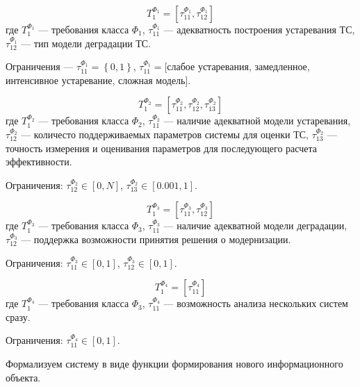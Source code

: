 \begin{equation}
    \label{eq:formal_requirements_1}
    T^{\Phi_1}_1=[\tau^{\Phi_1}_{11},\tau^{\Phi_1}_{12}]
\end{equation}
\vspace{\baselineskip}
где $T^{\Phi_1}_1$ --- требования класса $\Phi_1$,
$\tau^{\Phi_1}_{11}$ --- адекватность построения устаревания ТС,
$\tau^{\Phi_1}_{12}$ --- тип модели деградации ТС.

Ограничения --- $\tau^{\Phi_1}_{11} = \left\{ 0,1 \right\}$,
$\tau^{\Phi_1}_{11} = $[слабое устаревания, замедленное, интенсивное устаревание, сложная модель].


\begin{equation}
    \label{eq:formal_requirements_2}
    T^{\Phi_2}_1=[\tau^{\Phi_2}_{11},\tau^{\Phi_2}_{12},\tau^{\Phi_2}_{13}]
\end{equation}
\vspace{\baselineskip}
где $T^{\Phi_2}_1$ --- требования класса $\Phi_2$,
$\tau^{\Phi_2}_{11}$ --- наличие адекватной модели устаревания,
$\tau^{\Phi_2}_{12}$ --- количесто поддерживаемых параметров системы для оценки ТС,
$\tau^{\Phi_2}_{13}$ --- точность измерения и оценивания параметров для последующего расчета эффективности.

Ограничения: $\tau^{\Phi_2}_{12} \in [0,N]$,
$\tau^{\Phi_2}_{13} \in [0.001,1]$.

\begin{equation}
    \label{eq:formal_requirements_3}
    T^{\Phi_3}_1=[\tau^{\Phi_3}_{11},\tau^{\Phi_3}_{12}]
\end{equation}
\vspace{\baselineskip}
где $T^{\Phi_3}_1$ --- требования класса $\Phi_3$,
$\tau^{\Phi_3}_{11}$ --- наличие адекватной модели деградации,
$\tau^{\Phi_3}_{12}$ --- поддержка возможности принятия решения о модернизации.

Ограничения: $\tau^{\Phi_3}_{11} \in [0,1]$,
$\tau^{\Phi_3}_{12} \in [0,1]$.

\begin{equation}
    \label{eq:formal_requirements_4}
    T^{\Phi_4}_1=[\tau^{\Phi_4}_{11}]
\end{equation}
\vspace{\baselineskip}
где $T^{\Phi_4}_1$ --- требования класса $\Phi_3$,
$\tau^{\Phi_4}_{11}$ --- возможность анализа нескольких систем сразу.

Ограничения: $\tau^{\Phi_4}_{11} \in [0,1]$.

Формализуем систему в виде функции формирования нового информационного объекта.

